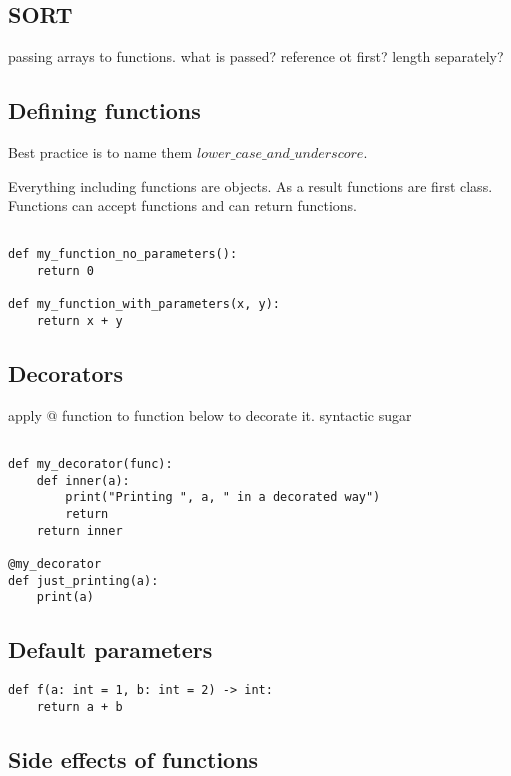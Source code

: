 
\subsection{SORT}

passing arrays to functions. what is passed? reference ot first? length separately?

\subsection{Defining functions}

Best practice is to name them \(lower\_case\_and\_underscore\).

Everything including functions are objects. As a result functions are first class. Functions can accept functions and can return functions.

\begin{verbatim}

def my_function_no_parameters():
    return 0
    
def my_function_with_parameters(x, y):
    return x + y

\end{verbatim}

\subsection{Decorators}

apply @ function to function below to decorate it. syntactic sugar

\begin{verbatim}

def my_decorator(func):
    def inner(a):
        print("Printing ", a, " in a decorated way")
        return
    return inner
    
@my_decorator
def just_printing(a):
    print(a)

\end{verbatim}

\subsection{Default parameters}

\begin{verbatim}
def f(a: int = 1, b: int = 2) -> int:
    return a + b
\end{verbatim}

\subsection{Side effects of functions}

